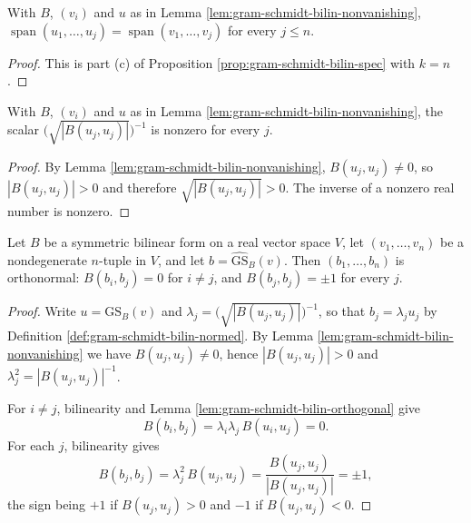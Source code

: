 \begin{lemma}
\label{lem:gram-schmidt-bilin-flag}
\leanok
{}
With $B$, $(v_i)$ and $u$ as in Lemma \ref{lem:gram-schmidt-bilin-nonvanishing}, $\operatorname{span}(u_1,\ldots,u_j) = \operatorname{span}(v_1,\ldots,v_j)$ for every $j \leq n$.
\end{lemma}

\begin{proof}
\leanok
{}
This is part (c) of Proposition \ref{prop:gram-schmidt-bilin-spec} with $k = n$.
\end{proof}

\begin{lemma}
\label{lem:gram-schmidt-bilin-normalizer-ne-zero}
\leanok
{}
With $B$, $(v_i)$ and $u$ as in Lemma \ref{lem:gram-schmidt-bilin-nonvanishing}, the scalar $\bigl(\sqrt{|B(u_j,u_j)|}\bigr)^{-1}$ is nonzero for every $j$.
\end{lemma}

\begin{proof}
\leanok
{}
By Lemma \ref{lem:gram-schmidt-bilin-nonvanishing}, $B(u_j,u_j) \neq 0$, so $|B(u_j,u_j)| > 0$ and therefore $\sqrt{|B(u_j,u_j)|} > 0$. The inverse of a nonzero real number is nonzero.
\end{proof}

\begin{proposition}
\label{prop:gram-schmidt-bilin-orthonormal}
\leanok
{}
Let $B$ be a symmetric bilinear form on a real vector space $V$, let $(v_1,\ldots,v_n)$ be a nondegenerate $n$-tuple in $V$, and let $b = \widehat{\mathrm{GS}}_B(v)$. Then $(b_1,\ldots,b_n)$ is orthonormal: $B(b_i,b_j) = 0$ for $i \neq j$, and $B(b_j,b_j) = \pm 1$ for every $j$.
\end{proposition}

\begin{proof}
\leanok
{}
Write $u = \mathrm{GS}_B(v)$ and $\lambda_j = \bigl(\sqrt{|B(u_j,u_j)|}\bigr)^{-1}$, so that $b_j = \lambda_j u_j$ by Definition \ref{def:gram-schmidt-bilin-normed}. By Lemma \ref{lem:gram-schmidt-bilin-nonvanishing} we have $B(u_j,u_j) \neq 0$, hence $|B(u_j,u_j)| > 0$ and $\lambda_j^2 = |B(u_j,u_j)|^{-1}$.

For $i \neq j$, bilinearity and Lemma \ref{lem:gram-schmidt-bilin-orthogonal} give
\[
B(b_i,b_j) = \lambda_i \lambda_j \, B(u_i,u_j) = 0 .
\]
For each $j$, bilinearity gives
\[
B(b_j,b_j) = \lambda_j^2 \, B(u_j,u_j) = \frac{B(u_j,u_j)}{|B(u_j,u_j)|} = \pm 1 ,
\]
the sign being $+1$ if $B(u_j,u_j) > 0$ and $-1$ if $B(u_j,u_j) < 0$.
\end{proof}

